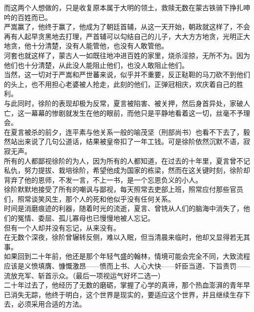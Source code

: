 \begin{multicols}{\theparacolNo}
而这两个人想做的，只是收复原本属于大明的领土，救赎无数在蒙古铁骑下挣扎呻吟的百姓而已。\\

严嵩赢了，他终于赢了，他成为了朝廷首辅，从这一天开始，朝政就这样了，不会再有人起早贪黑地去打理，严首辅可以勾结自己的儿子，大大方方地贪，光明正大地贪，他十分清楚，没有人能管他，也没有人敢管他。\\

河套也就这样了，蒙古人一如既往地冲进百姓的家里，烧杀淫掠，无所不为。因为他们也十分清楚，从此没人能阻止他们，也没人敢阻止他们。\\

当然，这一切对于严嵩和严世蕃来说，似乎并不重要，反正鞑靼的马刀砍不到他们的头上，也不用担心老婆被人抢走，此刻的他们，正弹冠相庆，欢庆着自己的胜利。\\

与此同时，徐阶的表现却极为反常，夏言被陷害、被关押，然后身首异处，家破人亡，这一幕幕的惨剧就发生在他的眼前，而他只是平静地看着这一切，丝毫不予理会。\\

在夏言被杀的前夕，连平素与他关系一般的喻茂坚（刑部尚书）也看不下去了，毅然站出来说了几句公道话，结果被皇帝扣了一年工钱。可是徐阶依然沉默不语，寂寂无声。\\

所有的人都鄙视徐阶的为人，因为所有的人都知道，在过去的十年里，夏言曾不记私仇，努力提拔、栽培徐阶，希望他成为国家的栋梁，然而在这关键时刻，徐阶却背弃了他的恩师，不发一言，不上一书，是一个忘恩负义的小人。\\

徐阶默默地接受了所有的嘲讽与鄙视，每天照常去吏部上班，照常应付那些官员们，照常谈笑风生，那个人的死和他似乎没有任何关系。\\

时间是消磨痕迹的利器，随着时光的流逝，夏言、曾铣从人们的脑海中消失了，他们的冤情、委屈、孤儿寡母也已慢慢地被人忘记。\\

但有一个人却并没有忘记，从来没有。\\

在无数个深夜，徐阶曾辗转反侧，难以入眠，但当清晨来临时，他却又显得若无其事。\\

如果回到二十年前，他还是那个年轻气盛的翰林，情境可能会完全不同，大致流程应该是义愤填膺、慷慨激昂——愤而上书、人心大快——奸臣当道、下旨责罚——流放充军、斩首示众。（最后一项视运气好坏二选一）\\

二十年过去了，他经历了无数的磨砺，掌握了心学的真谛，那个热血澎湃的青年早已消失无踪，他终于明白，这个世界是现实的，要适应这个世界，并且继续生存下去，必须采用合适的方法。\\


\end{multicols}

